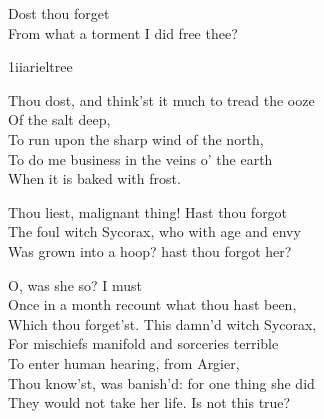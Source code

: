 \begin{verse_speech}[Prospero] 
Dost thou forget\\
From what a torment I did free thee?
\end{verse_speech}

	

\begin{pictures} %
\begin{bwbigpic}
	[\picwidth]
	{1iiarieltree}
	{}
\end{bwbigpic}

\end{pictures}



\begin{verse_speech}[Prospero] 
Thou dost, and think'st it much to tread the ooze\\
Of the salt deep,\\
To run upon the sharp wind of the north,\\
To do me business in the veins o' the earth\\
When it is baked with frost.
\end{verse_speech}


\begin{verse_speech}[Prospero] 
Thou liest, malignant thing! Hast thou forgot\\
The foul witch Sycorax, who with age and envy\\
Was grown into a hoop? hast thou forgot her?
\end{verse_speech}

	
	
	
\begin{verse_speech}[Prospero] 
O, was she so? I must\\
Once in a month recount what thou hast been,\\
Which thou forget'st. This damn'd witch Sycorax,\\
For mischiefs manifold and sorceries terrible\\
To enter human hearing, from Argier,\\
Thou know'st, was banish'd: for one thing she did\\
They would not take her life. Is not this true?
\end{verse_speech}

